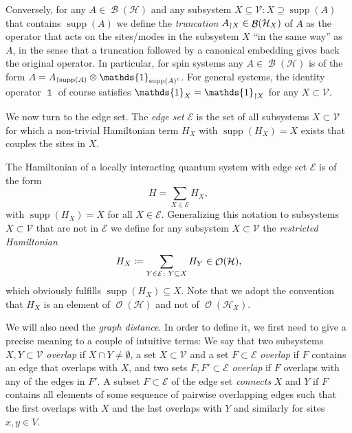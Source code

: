 \documentclass[a4paper,12pt,listof=totoc,index=totoc,bibliography=totoc,headsepline=false,headings=normal,BCOR16.153846mm,DIV12,headinclude,twoside,cleardoublepage=empty,numbers=noenddot,final]{scrreprt}
\theoremstyle{mystyle}
\numberwithin{equation}{section}
\numberwithin{figure}{section}
\numberwithin{lemma}{section}
\numberwithin{theorem}{section}
\numberwithin{corollary}{section}
\numberwithin{definition}{section}
\numberwithin{conjecture}{section}
\numberwithin{observation}{section}
\newcommand{\+}{\mkern2mu}
\newcommand{\coloneqq}{\mathrel{\vcentcolon\mkern-1.2mu=}} %
\newcommand{\suchthat}{\colon}
\newcommand{\itholds}{\colon\mathchoice{\quad}{}{}{}}
\renewcommand{\H}{H}
\newcommand{\Vset}{\mathcal{V}}
\newcommand{\Eset}{\mathcal{E}}
\newcommand{\compl}[1]{{{#1}^c}}
\newcommand{\trunc}[2]{{#1}_{\upharpoonright \mathnormal{#2}}}
\DeclareMathOperator{\1}{\mathds{1}}
\DeclareMathOperator{\Bop}{\mathcal{B}}
\DeclareMathOperator{\Obs}{\mathcal{O}}
\DeclareMathOperator{\supp}{supp}
\newcommand{\mc}[1]{\mathcal{#1}}
\newcommand{\mcH}{\mc{H}}
\begin{document}
Conversely, for any $A \in \Bop(\mcH)$ and any subsystem $X \subseteq \Vset\colon X \supseteq \supp(A)$ that contains $\supp(A)$ we define the \emph{truncation} $\trunc A X \in \Bop(\mcH_X)$ of $A$ as the operator that acts on the sites/modes in the subsystem $X$ ``in the same way'' as $A$, in the sense that a truncation followed by a canonical embedding gives back the original operator.
In particular, for spin systems any $A \in \Bop(\mcH)$ is of the form $A = \trunc A {\supp(A)} \otimes \1_{\compl{\supp(A)}}$.
For general systems, the identity operator $\1$ of course satisfies $\1_X = \trunc \1 X$ for any $X \subset \Vset$.

We now turn to the edge set.
The \emph{edge set} $\Eset$ is the set of all subsystems $X \subset \Vset$ for which a non-trivial Hamiltonian term $\H_X$ with $\supp(\H_X) = X$ exists that couples the sites in $X$.

The Hamiltonian of a locally interacting quantum system with edge set $\Eset$ is of the form
\begin{equation} \label{eq:localhamiltonian}
  \H = \sum_{X \in \Eset} \H_X ,
\end{equation}
with $\supp(\H_X) = X$ for all $X \in \Eset$.
Generalizing this notation to subsystems $X \subset \Vset$ that are not in $\Eset$ we define for any subsystem $X \subset \Vset$ the \emph{restricted Hamiltonian}
\begin{equation} \label{eq:restrictedhamiltonian}
  \H_X \coloneqq \sum_{Y \in \Eset\colon Y\subseteq X} \H_Y  \in \Obs(\mcH) ,
\end{equation}
which obviously fulfills $\supp(\H_X) \subseteq X$.
Note that we adopt the convention that $\H_X$ is an element of $\Obs(\mcH)$ and not of $\Obs(\mcH_X)$.

We will also need the \emph{graph distance}.
In order to define it, we first need to give a precise meaning to a couple of intuitive terms:
We say that two subsystems $X,Y \subset \Vset$ \emph{overlap} if $X \cap Y \neq \emptyset$,
a set $X \subset \Vset$ and a set $F\subset \Eset$ \emph{overlap} if $F$ contains an edge that overlaps with $X$, and two sets $F,F'\subset \Eset$ \emph{overlap} if $F$ overlaps with any of the edges in $F'$.
A subset $F \subset \Eset$ of the edge set \emph{connects} $X$ and $Y$ if $F$ contains all elements of some sequence of pairwise overlapping edges such that the first overlaps with $X$ and the last overlaps with $Y$ and similarly for sites $x,y \in V$.
\end{document}
